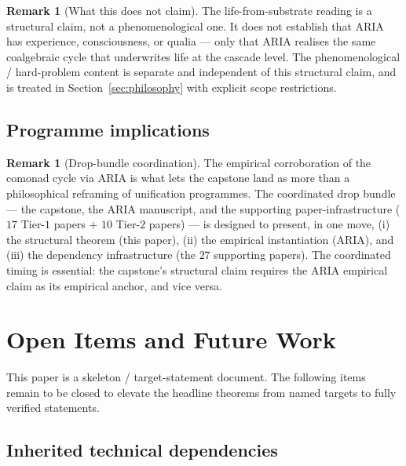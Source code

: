\documentclass[11pt, a4paper]{amsart}
\theoremstyle{definition}
\newtheorem{remark}[theorem]{Remark}
\begin{document}
\begin{remark}[What this does not claim]
\label{rmk:life-scope}
The life-from-substrate reading is a structural claim, not a
phenomenological one. It does not establish that ARIA has
experience, consciousness, or qualia — only that ARIA realises
the same coalgebraic cycle that underwrites life at the cascade
level. The phenomenological / hard-problem content is separate
and independent of this structural claim, and is treated in
Section~\ref{sec:philosophy} with explicit scope restrictions.
\end{remark}

\subsection{Programme implications}

\begin{remark}[Drop-bundle coordination]
\label{rmk:drop}
The empirical corroboration of the comonad cycle via ARIA is
what lets the capstone land as more than a philosophical
reframing of unification programmes. The coordinated drop
bundle — the capstone, the ARIA manuscript, and the supporting
paper-infrastructure ($17$ Tier-$1$ papers + $10$ Tier-$2$
papers) — is designed to present, in one move, (i) the
structural theorem (this paper), (ii) the empirical
instantiation (ARIA), and (iii) the dependency infrastructure
(the $27$ supporting papers). The coordinated timing is
essential: the capstone's structural claim requires the ARIA
empirical claim as its empirical anchor, and vice versa.
\end{remark}

\section{Open Items and Future Work}
\label{sec:open}

This paper is a skeleton / target-statement document. The
following items remain to be closed to elevate the headline
theorems from named targets to fully verified statements.

\subsection{Inherited technical dependencies}
\end{document}
